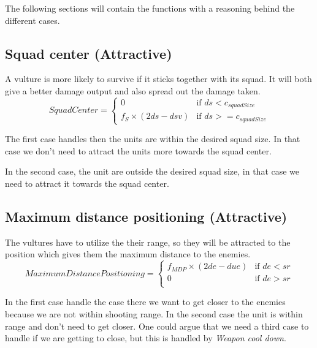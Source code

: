 	The following sections will contain the functions with a reasoning behind the different cases.
	
	\subsection{Squad center (Attractive)}
		\label{SCA_label}A vulture is more likely to survive if it sticks together with its squad. 
		It will both give a better damage output and also spread out the damage taken.
		\begin{displaymath}
			SquadCenter  = \begin{cases}
					0 & \text{if } ds < c_{squadSize} \\
					f_{S} \times (2ds - dsv) & \text{if } ds >= c_{squadSize}
				\end{cases}		
		\end{displaymath}
		
	    The first case handles then the units are within the desired squad size. In that case we don't need to attract the units more towards the squad center.
	    
	    In the second case, the unit are outside the desired squad size, in that case we need to attract it towards the squad center.

	\subsection{Maximum distance positioning (Attractive)}
		The vultures have to utilize the their range, so they will be attracted to the position which gives them the maximum distance to the enemies.
		\begin{displaymath}
			MaximumDistancePositioning = \begin{cases}
					f_{MDP} \times (2de - due) & \text{if } de < sr\\
					0 & \text{if } de > sr\\
				\end{cases}		
		\end{displaymath}
		
		In the first case handle the case there we want to get closer to the enemies because we are not within shooting range.
		In the second case the unit is within range and don't need to get closer. One could argue that we need a third case to handle if we are getting to close, but this is handled by \textit{Weapon cool down}.
		
